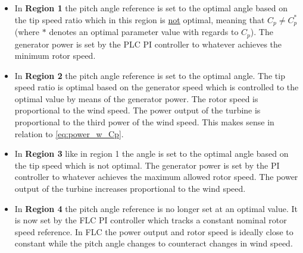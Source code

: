 \begin{itemize}
	\item In \textbf{Region 1} the pitch angle reference is set to the optimal angle based on the tip speed ratio which in this region is \underline{not} optimal, meaning that $ C_p \neq C_p^* $ (where $ * $ denotes an optimal parameter value with regards to $ C_p $). The generator power is set by the PLC PI controller to whatever achieves the minimum rotor speed.
	\item In \textbf{Region 2} the pitch angle reference is set to the optimal angle. The tip speed ratio is optimal based on the generator speed which is controlled to the optimal value by means of the generator power. The rotor speed is proportional to the wind speed. The power output of the turbine is proportional to the third power of the wind speed. This makes sense in relation to \cref{eq:power_w_Cp}.
	\item In \textbf{Region 3} like in region 1 the angle is set to the optimal angle based on the tip speed which is not optimal. The generator power is set by the PI controller to whatever achieves the maximum allowed rotor speed. The power output of the turbine increases proportional to the wind speed.
	\item In \textbf{Region 4} the pitch angle reference is no longer set at an optimal value. It is now set by the FLC PI controller which tracks a constant nominal rotor speed reference. In FLC the power output and rotor speed is ideally close to constant while the pitch angle changes to counteract changes in wind speed.
\end{itemize}



